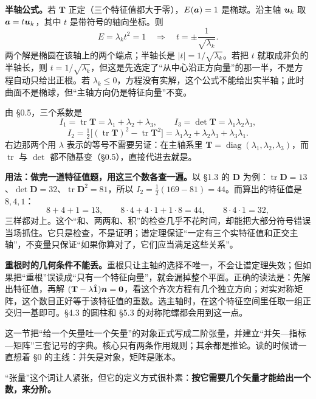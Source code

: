 \documentclass[11pt]{ctexart}
\newcommand{\ten}[1]{\mathbf{#1}}
\newcommand{\unitd}{\hat{\ten{1}}}
\newcommand{\tr}{\operatorname{tr}}
\let\orighdr\hdr
\renewcommand{\hdr}[2]{\par\needspace{10\baselineskip}\orighdr{#1}{#2}}
\let\origsubhdr\subhdr
\renewcommand{\subhdr}[1]{\par\needspace{3\baselineskip}\origsubhdr{#1}}
\begin{document}
\textbf{半轴公式。}若 $\ten T$ 正定（三个特征值都大于零），$E(\boldsymbol{a})=1$ 是椭球。沿主轴 $\boldsymbol{u}_k$ 取 $\boldsymbol{a}=t\boldsymbol{u}_k$，其中 $t$ 是带符号的轴向坐标。则
\[
E=\lambda_k t^2=1
\quad\Longrightarrow\quad
t=\pm\frac{1}{\sqrt{\lambda_k}} .
\]
两个解是椭圆在该轴上的两个端点；半轴长是 $|t|=1/\sqrt{\lambda_k}$。若把 $t$ 就取成非负的半轴长，则 $t=1/\sqrt{\lambda_k}$，但这是先选定了“从中心沿正方向量”的那一半，不是方程自动只给出正根。若 $\lambda_k\le0$，方程没有实解，这个公式不能给出实半轴；此时曲面不是椭球，但“主轴方向仍是特征向量”不变。

\label{subsec:invariants2}

由 \S0.5，三个系数是
\[
I_1=\tr\ten T=\lambda_1+\lambda_2+\lambda_3,
\qquad
I_3=\det\ten T=\lambda_1\lambda_2\lambda_3,
\]
\[
I_2=\tfrac12\bigl[(\tr\ten T)^2-\tr\ten T^2\bigr]
=\lambda_1\lambda_2+\lambda_2\lambda_3+\lambda_3\lambda_1 .
\]
右边那两个用 $\lambda$ 表示的等号不需要另证：在主轴系里 $\ten T=\operatorname{diag}(\lambda_1,\lambda_2,\lambda_3)$，而 $\tr$ 与 $\det$ 都不随基变（\S0.5），直接代进去就是。

\textbf{用法：做完一道特征值题，用这三个数各查一遍。}以 \S1.3 的 $\ten D$ 为例：$\tr\ten D=13$、$\det\ten D=32$、$\tr\ten D^2=81$，所以 $I_2=\tfrac12(169-81)=44$。而算出的特征值是 $8,4,1$：
\[
8+4+1=13,\qquad 8\cdot4+4\cdot1+1\cdot8=44,\qquad 8\cdot4\cdot1=32,
\]
三样都对上。这个“和、两两和、积”的检查几乎不花时间，却能把大部分符号错误当场抓住。它只是检查，不是证明；谱定理保证“一定有三个实特征值和正交主轴”，不变量只保证“如果你算对了，它们应当满足这些关系”。

\textbf{重根时的几何条件不能丢。}重根只让主轴的选择不唯一，不会让谱定理失效；但如果把“重根”误读成“只有一个特征向量”，就会漏掉整个平面。正确的读法是：先解出特征值，再解 $(\ten T-\lambda\unitd)\vect n=\vect0$，看这个齐次方程有几个独立方向；对实对称矩阵，这个数目正好等于该特征值的重数。选主轴时，在这个特征空间里任取一组正交归一基即可。\S4.3 的圆柱和 \S5.3 的对称陀螺都会用到这一点。

\label{sec:tensor}

这一节把“给一个矢量吐一个矢量”的对象正式写成二阶张量，并建立“并矢—指标—矩阵”三套记号的字典。核心只有两条作用规则；其余都是推论。读的时候请一直想着 \S0 的主线：并矢是对象，矩阵是账本。

\label{subsec:order}

“张量”这个词让人紧张，但它的定义方式很朴素：\textbf{按它需要几个矢量才能给出一个数，来分阶。}
\end{document}
